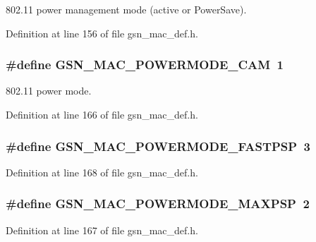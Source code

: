 802.11 power management mode (active or PowerSave). 



Definition at line 156 of file gsn\_\-mac\_\-def.h.

\hypertarget{a00642_ga8562dc7df79490dc400c2a694356c55d}{
\subsubsection[{GSN\_\-MAC\_\-POWERMODE\_\-CAM}]{\setlength{\rightskip}{0pt plus 5cm}\#define GSN\_\-MAC\_\-POWERMODE\_\-CAM~1}}
\label{a00642_ga8562dc7df79490dc400c2a694356c55d}


802.11 power mode. 



Definition at line 166 of file gsn\_\-mac\_\-def.h.

\hypertarget{a00642_ga4533fe3149beb1276a66d8d703fb8c4a}{
\subsubsection[{GSN\_\-MAC\_\-POWERMODE\_\-FASTPSP}]{\setlength{\rightskip}{0pt plus 5cm}\#define GSN\_\-MAC\_\-POWERMODE\_\-FASTPSP~3}}
\label{a00642_ga4533fe3149beb1276a66d8d703fb8c4a}


Definition at line 168 of file gsn\_\-mac\_\-def.h.

\hypertarget{a00642_ga751f71fb490748186b9e7ffc85d77b74}{
\subsubsection[{GSN\_\-MAC\_\-POWERMODE\_\-MAXPSP}]{\setlength{\rightskip}{0pt plus 5cm}\#define GSN\_\-MAC\_\-POWERMODE\_\-MAXPSP~2}}
\label{a00642_ga751f71fb490748186b9e7ffc85d77b74}


Definition at line 167 of file gsn\_\-mac\_\-def.h.

